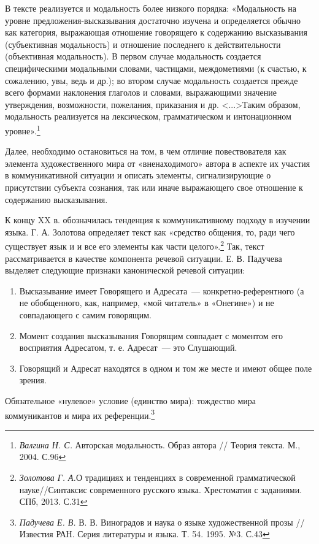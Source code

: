\documentclass{kursa4}
\begin{document}
      В тексте реализуется и модальность более низкого порядка: «Модальность на уровне предложения-высказывания достаточно изучена и определяется обычно как категория, выражающая отношение говорящего к содержанию высказывания (субъективная модальность) и отношение последнего к действительности (объективная модальность). В первом случае модальность создается специфическими модальными словами, частицами, междометиями (к счастью, к сожалению, увы, ведь и др.); во втором случае модальность создается прежде всего формами наклонения глаголов и словами, выражающими значение утверждения, возможности, пожелания, приказания и др. \textless{}...\textgreater{}Таким образом, модальность реализуется на лексическом, грамматическом и интонационном уровне».\footnote{\textit{{Валгина Н. С. }}{Авторская модальность. Образ автора // Теория текста. М., 2004. С.96}} 

      Далее, необходимо остановиться на том, в чем отличие повествователя как элемента художественного мира от «вненаходимого» автора в аспекте их участия в коммуникативной ситуации и описать элементы, сигнализирующие о присутствии субъекта сознания, так или иначе выражающего свое отношение к содержанию высказывания. 

      К концу XX в. обозначилась тенденция к коммуникативному подходу в изучении языка. Г. А. Золотова определяет текст как «средство общения, то, ради чего существует язык и и все его элементы как части целого».\footnote{\textit{Золотова Г. А.}О традициях и тенденциях в современной грамматической науке//Синтаксис современного русского языка. Хрестоматия с заданиями. СПб, 2013. С.31} Так, текст рассматривается в качестве компонента речевой ситуации. \newline
      Е. В. Падучева выделяет следующие признаки канонической речевой ситуации: 

      \begin{enumerate}
      \item Высказывание имеет Говорящего и Адресата~--- конкретно-референтного (а не обобщенного, как, например, «мой читатель» в «Онегине») и не совпадающего с самим говорящим. 
      \item Момент создания высказывания Говорящим совпадает с моментом его восприятия Адресатом, т. е. Адресат~--- это Слушающий. 
      \item Говорящий и Адресат находятся в одном и том же месте и имеют общее поле зрения. 
      \end{enumerate}
      Обязательное «нулевое» условие (единство мира): тождество мира коммуникантов и мира их референции.\footnote{\textit{Падучева Е. В. }В. В. Виноградов и наука о языке художественной прозы // Известия РАН. Серия литературы и языка. Т. 54. 1995. №3. С.43} 
\end{document}
